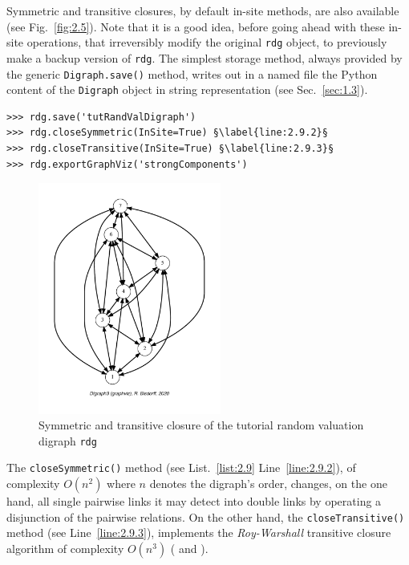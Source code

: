 Symmetric and transitive closures, by default in-site methods, are also available (see Fig.~\vref{fig:2.5}). Note that it is a good idea, before going ahead with these in-site operations, that irreversibly modify the original \texttt{rdg} object, to previously make a backup version of \texttt{rdg}. The simplest storage method, always provided by the generic \texttt{Digraph.save()} method, writes out in a named file the Python content of the \texttt{Digraph} object in string representation (see Sec.~\vref{sec:1.3}).
\begin{lstlisting}[caption={Symmeric and transitive closures},label=list:2.9]
>>> rdg.save('tutRandValDigraph')
>>> rdg.closeSymmetric(InSite=True) §\label{line:2.9.2}§
>>> rdg.closeTransitive(InSite=True) §\label{line:2.9.3}§
>>> rdg.exportGraphViz('strongComponents')
\end{lstlisting}
\begin{figure}[h]
\sidecaption[t]
\includegraphics[width=6cm]{Figures/2-5-strongComponents.pdf}
\caption{Symmetric and transitive closure of the tutorial random valuation digraph \texttt{rdg}}
\label{fig:2.5}       %
\end{figure}

The \texttt{closeSymmetric()} method (see List.~\vref{list:2.9} Line~\ref{line:2.9.2}), of complexity $O(n^2)$ where $n$ denotes the digraph's order, changes, on the one hand, all single pairwise links it may detect into double links by operating a disjunction of the pairwise relations. On the other hand, the \texttt{closeTransitive()}  method (see Line~\ref{line:2.9.3}), implements the \emph{Roy-Warshall} transitive closure algorithm of complexity $O(n^3)$   (\citealp{ROY-1959} and \citealp{WAR-1962}).

